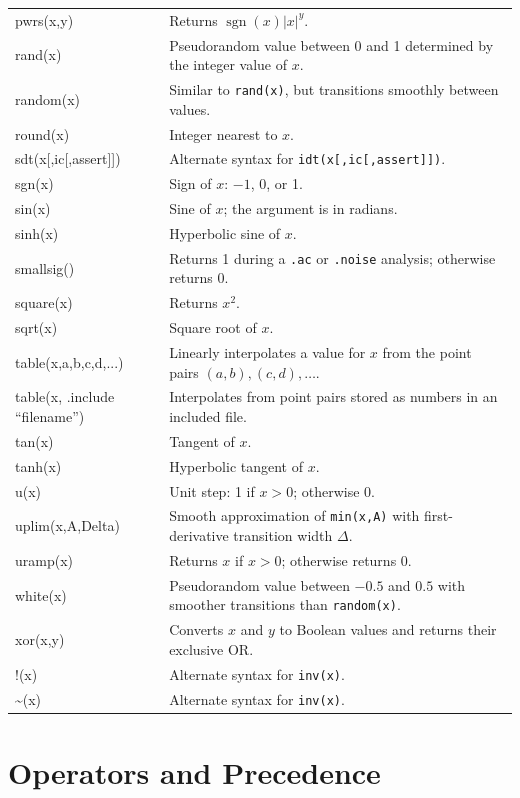 \begin{longtable}{>{\ttfamily\raggedright\arraybackslash}p{}
                  >{\raggedright\arraybackslash}p{}}
pwrs(x,y) & Returns $\operatorname{sgn}(x)|x|^y$. \\
rand(x) & Pseudorandom value between 0 and 1 determined by the integer value of $x$. \\
random(x) & Similar to \texttt{rand(x)}, but transitions smoothly between values. \\
round(x) & Integer nearest to $x$. \\
sdt(x[,ic[,assert]]) & Alternate syntax for \texttt{idt(x[,ic[,assert]])}. \\
sgn(x) & Sign of $x$: $-1$, 0, or 1. \\
sin(x) & Sine of $x$; the argument is in radians. \\
sinh(x) & Hyperbolic sine of $x$. \\
smallsig() & Returns 1 during a \texttt{.ac} or \texttt{.noise} analysis; otherwise returns 0. \\
square(x) & Returns $x^2$. \\
sqrt(x) & Square root of $x$. \\
table(x,a,b,c,d,...) & Linearly interpolates a value for $x$ from the point pairs $(a,b),(c,d),\ldots$. \\
table(x, .include ``filename'') & Interpolates from point pairs stored as numbers in an included file. \\
tan(x) & Tangent of $x$. \\
tanh(x) & Hyperbolic tangent of $x$. \\
u(x) & Unit step: 1 if $x>0$; otherwise 0. \\
uplim(x,A,Delta) & Smooth approximation of \texttt{min(x,A)} with first-derivative transition width $\Delta$. \\
uramp(x) & Returns $x$ if $x>0$; otherwise returns 0. \\
white(x) & Pseudorandom value between $-0.5$ and $0.5$ with smoother transitions than \texttt{random(x)}. \\
xor(x,y) & Converts $x$ and $y$ to Boolean values and returns their exclusive OR. \\
!(x) & Alternate syntax for \texttt{inv(x)}. \\
\textasciitilde(x) & Alternate syntax for \texttt{inv(x)}. \\
\end{longtable}
\endgroup

\section{Operators and Precedence}
\label{sec:behavioral-operators}

